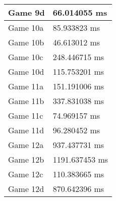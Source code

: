 \begin{tabular}{|l|l|}
	Game 9d & 66.014055 ms \\ \hline
	Game 10a & 85.933823 ms \\ \hline
	Game 10b & 46.613012 ms \\ \hline
	Game 10c & 248.446715 ms \\ \hline
	Game 10d & 115.753201 ms \\ \hline
	Game 11a & 151.191006 ms \\ \hline
	Game 11b & 337.831038 ms \\ \hline
	Game 11c & 74.969157 ms \\ \hline
	Game 11d & 96.280452 ms \\ \hline
	Game 12a & 937.437731 ms \\ \hline
	Game 12b & 1191.637453 ms \\ \hline
	Game 12c & 110.383665 ms \\ \hline
	Game 12d & 870.642396 ms \\ \hline
\end{tabular}
